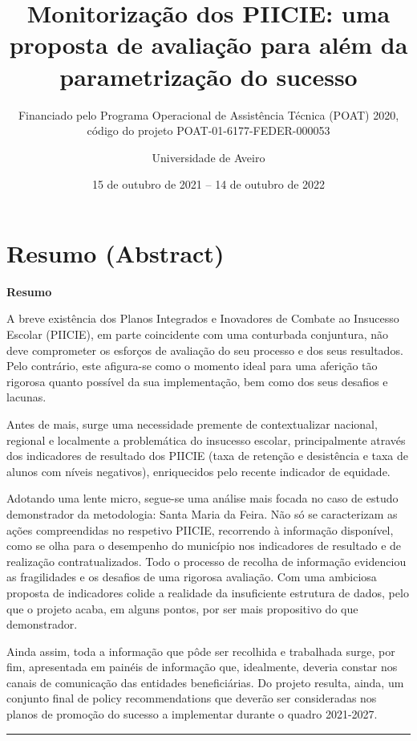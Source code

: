 \documentclass[
]{book}
\title{Monitorização dos PIICIE: uma proposta de avaliação para além da parametrização do sucesso}
\subtitle{Financiado pelo Programa Operacional de Assistência Técnica (POAT) 2020, código do projeto POAT-01-6177-FEDER-000053}
\author{Universidade de Aveiro}
\date{15 de outubro de 2021 -- 14 de outubro de 2022}
\begin{document}
\maketitle

{
\setcounter{tocdepth}{1}
\tableofcontents
}
\hypertarget{resumo-abstract}{%
\chapter{Resumo (Abstract)}\label{resumo-abstract}}

\textbf{Resumo}

A breve existência dos Planos Integrados e Inovadores de Combate ao Insucesso Escolar (PIICIE), em parte coincidente com uma conturbada conjuntura, não deve comprometer os esforços de avaliação do seu processo e dos seus resultados. Pelo contrário, este afigura-se como o momento ideal para uma aferição tão rigorosa quanto possível da sua implementação, bem como dos seus desafios e lacunas.

Antes de mais, surge uma necessidade premente de contextualizar nacional, regional e localmente a problemática do insucesso escolar, principalmente através dos indicadores de resultado dos PIICIE (taxa de retenção e desistência e taxa de alunos com níveis negativos), enriquecidos pelo recente indicador de equidade.

Adotando uma lente micro, segue-se uma análise mais focada no caso de estudo demonstrador da metodologia: Santa Maria da Feira. Não só se caracterizam as ações compreendidas no respetivo PIICIE, recorrendo à informação disponível, como se olha para o desempenho do município nos indicadores de resultado e de realização contratualizados. Todo o processo de recolha de informação evidenciou as fragilidades e os desafios de uma rigorosa avaliação. Com uma ambiciosa proposta de indicadores colide a realidade da insuficiente estrutura de dados, pelo que o projeto acaba, em alguns pontos, por ser mais propositivo do que demonstrador.

Ainda assim, toda a informação que pôde ser recolhida e trabalhada surge, por fim, apresentada em painéis de informação que, idealmente, deveria constar nos canais de comunicação das entidades beneficiárias. Do projeto resulta, ainda, um conjunto final de policy recommendations que deverão ser consideradas nos planos de promoção do sucesso a implementar durante o quadro 2021-2027.

\begin{center}\rule{0.5\linewidth}{0.5pt}\end{center}
\end{document}
